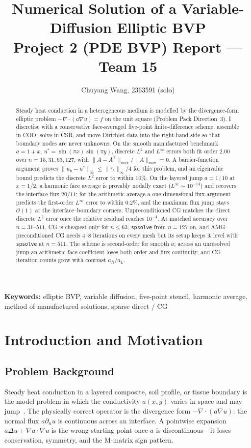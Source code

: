 \documentclass[11pt,a4paper]{article}
\title{%
  Numerical Solution of a Variable-Diffusion Elliptic BVP\\[0.4em]
  \large Project 2 (PDE BVP) Report --- Team 15
}
\author{Chuyang Wang, 2363591 \quad (solo)}
\date{}
\begin{document}
\maketitle

\begin{abstract}
Steady heat conduction in a heterogeneous medium is modelled by the divergence-form elliptic problem
\(-\nabla\cdot(a\nabla u)=f\) on the unit square (Problem Pack Direction~3).
I discretise with a conservative face-averaged five-point finite-difference scheme, assemble in COO, solve in CSR, and move Dirichlet data into the right-hand side so that boundary nodes are never unknowns.
On the smooth manufactured benchmark \(a=1+x\), \(u^*=\sin(\pi x)\sin(\pi y)\), discrete \(L^2\) and \(L^\infty\) errors both fit order \(2.00\) over \(n=15,31,63,127\), with \(\|A-A^\top\|_{\max}/\|A\|_{\max}=0\).
A barrier-function argument proves \(\|u_h-u^*\|_\infty\le\|\tau_h\|_\infty/4\) for this problem, and an eigenvalue bound predicts the discrete \(L^2\) error to within \(10\%\).
On the layered jump \(a=1\,|\,10\) at \(x=1/2\), a harmonic face average is provably nodally exact (\(L^\infty\sim 10^{-14}\)) and recovers the interface flux \(20/11\); for the arithmetic average a one-dimensional flux argument predicts the first-order \(L^\infty\) error to within \(0.2\%\), and the maximum flux jump stays \(\mathcal{O}(1)\) at the interface--boundary corners.
Unpreconditioned CG matches the direct discrete \(L^2\) error once the relative residual reaches \(10^{-4}\).
At matched accuracy over \(n=31\)--\(511\), CG is cheapest only for \(n\le 63\), \texttt{spsolve} from \(n=127\) on, and AMG-preconditioned CG needs \(4\)--\(8\) iterations on every mesh but its setup keeps it level with \texttt{spsolve} at \(n=511\).
The scheme is second-order for smooth \(a\); across an unresolved jump an arithmetic face coefficient loses both order and flux continuity, and CG iteration counts grow with contrast \(a_R/a_L\).
\end{abstract}

\noindent\textbf{Keywords:} elliptic BVP, variable diffusion, five-point stencil, harmonic average, method of manufactured solutions, sparse direct / CG

\tableofcontents
\newpage

\section{Introduction and Motivation}
\subsection{Problem Background}
Steady heat conduction in a layered composite, soil profile, or tissue boundary is the model problem in which the conductivity \(a(x,y)\) varies in space and may jump~\cite{problemPack,hackbusch2017}.
The physically correct operator is the divergence form \(-\nabla\cdot(a\nabla u)\): the normal flux \(a\partial_n u\) is continuous across an interface.
A pointwise expansion \(a\Delta u+\nabla a\cdot\nabla u\) is the wrong starting point once \(a\) is discontinuous---it loses conservation, symmetry, and the M-matrix sign pattern.
\end{document}
